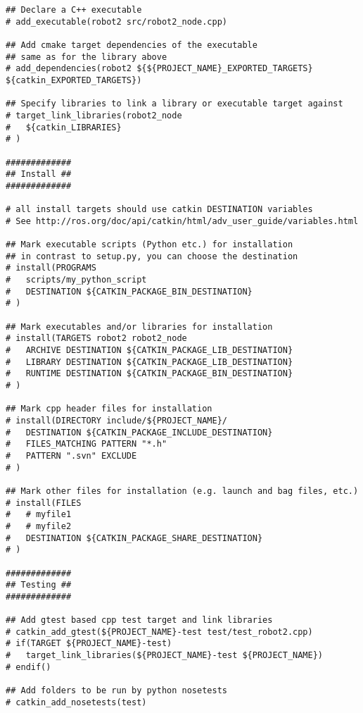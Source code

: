 \begin{lstlisting}
## Declare a C++ executable
# add_executable(robot2 src/robot2_node.cpp)

## Add cmake target dependencies of the executable
## same as for the library above
# add_dependencies(robot2 ${${PROJECT_NAME}_EXPORTED_TARGETS} ${catkin_EXPORTED_TARGETS})

## Specify libraries to link a library or executable target against
# target_link_libraries(robot2_node
#   ${catkin_LIBRARIES}
# )

#############
## Install ##
#############

# all install targets should use catkin DESTINATION variables
# See http://ros.org/doc/api/catkin/html/adv_user_guide/variables.html

## Mark executable scripts (Python etc.) for installation
## in contrast to setup.py, you can choose the destination
# install(PROGRAMS
#   scripts/my_python_script
#   DESTINATION ${CATKIN_PACKAGE_BIN_DESTINATION}
# )

## Mark executables and/or libraries for installation
# install(TARGETS robot2 robot2_node
#   ARCHIVE DESTINATION ${CATKIN_PACKAGE_LIB_DESTINATION}
#   LIBRARY DESTINATION ${CATKIN_PACKAGE_LIB_DESTINATION}
#   RUNTIME DESTINATION ${CATKIN_PACKAGE_BIN_DESTINATION}
# )

## Mark cpp header files for installation
# install(DIRECTORY include/${PROJECT_NAME}/
#   DESTINATION ${CATKIN_PACKAGE_INCLUDE_DESTINATION}
#   FILES_MATCHING PATTERN "*.h"
#   PATTERN ".svn" EXCLUDE
# )

## Mark other files for installation (e.g. launch and bag files, etc.)
# install(FILES
#   # myfile1
#   # myfile2
#   DESTINATION ${CATKIN_PACKAGE_SHARE_DESTINATION}
# )

#############
## Testing ##
#############

## Add gtest based cpp test target and link libraries
# catkin_add_gtest(${PROJECT_NAME}-test test/test_robot2.cpp)
# if(TARGET ${PROJECT_NAME}-test)
#   target_link_libraries(${PROJECT_NAME}-test ${PROJECT_NAME})
# endif()

## Add folders to be run by python nosetests
# catkin_add_nosetests(test)

\end{lstlisting}
